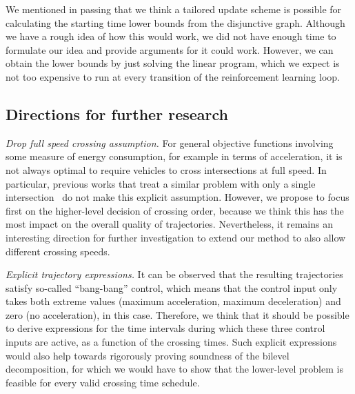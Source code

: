 \documentclass{article}
\theoremstyle{definition}
\theoremstyle{plain}
\begin{document}
We mentioned in passing that we think a tailored update scheme is possible for
calculating the starting time lower bounds from the disjunctive graph. Although
we have a rough idea of how this would work, we did not have enough time to
formulate our idea and provide arguments for it could work. However, we can
obtain the lower bounds by just solving the linear program, which we expect is
not too expensive to run at every transition of the reinforcement learning loop.


\subsection{Directions for further research}

\vspace{0.5em}\noindent
\textit{Drop full speed crossing assumption.} For general objective functions involving some
measure of energy consumption, for example in terms of acceleration, it is not
always optimal to require vehicles to cross intersections at full speed. In
particular, previous works that treat a similar problem with only a single
intersection~\cite{hultApproximateSolutionOptimal2015,zhaoBilevelProgrammingModel2021}
do not make this explicit assumption. However, we propose to focus first on the
higher-level decision of crossing order, because we think this has the most impact
on the overall quality of trajectories. Nevertheless, it remains an interesting
direction for further investigation to extend our method to also allow different
crossing speeds.

\vspace{0.5em}\noindent
\textit{Explicit trajectory expressions.}
It can be observed that the resulting trajectories satisfy so-called
``bang-bang'' control, which means that the control input only takes both
extreme values (maximum acceleration, maximum deceleration) and zero (no
acceleration), in this case. Therefore, we think that it should be possible to
derive expressions for the time intervals during which these three control
inputs are active, as a function of the crossing times.
%
Such explicit expressions would also help towards rigorously proving soundness
of the bilevel decomposition, for which we would have to show that the
lower-level problem is feasible for every valid crossing time schedule.
\end{document}
